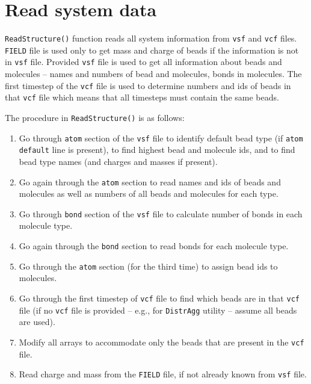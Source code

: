 \section{Read system data} \label{sec:ReadSystemData}

\texttt{ReadStructure()} function reads all system information from
\texttt{vsf} and \texttt{vcf} files. \texttt{FIELD} file is used only to
get mass and charge of beads if the information is not in \texttt{vsf}
file. Provided \texttt{vsf} file is used
to get all information about beads and molecules -- names and numbers of
bead and molecules, bonds in molecules.  The first timestep of the
\texttt{vcf} file is used to determine numbers and ids of beads in that
\texttt{vcf} file which means that all timesteps must contain the same
beads.

The procedure in \texttt{ReadStructure()} is as follows:
\begin{enumerate}
  \item Go through \texttt{atom} section of the \texttt{vsf} file to
    identify default bead type (if \texttt{atom default} line is present),
    to find highest bead and molecule ids, and to find bead type names (and
    charges and masses if present).
  \item Go again through the \texttt{atom} section to read names and ids of
    beads and molecules as well as numbers of all beads and molecules for
    each type.
  \item Go through \texttt{bond} section of the \texttt{vsf} file to
    calculate number of bonds in each molecule type.
  \item Go again through the \texttt{bond} section to read bonds for each
    molecule type.
  \item Go through the \texttt{atom} section (for the third time) to assign
    bead ids to molecules.
  \item Go through the first timestep of \texttt{vcf} file to find which
    beads are in that \texttt{vcf} file (if no \texttt{vcf} file is
    provided -- e.g., for \texttt{DistrAgg} utility -- assume all beads are
    used).
  \item Modify all arrays to accommodate only the beads that are present in
    the \texttt{vcf} file.
  \item Read charge and mass from the \texttt{FIELD} file, if not already
    known from \texttt{vsf} file.
\end{enumerate}
